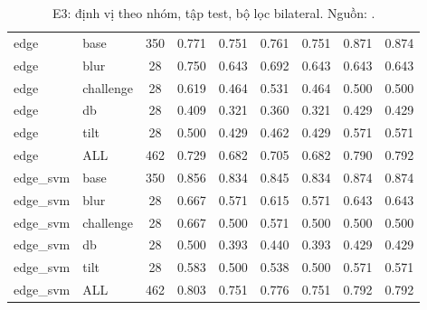 \begin{table}[htbp]
\centering
\caption[E3: định vị theo nhóm (test)]{E3: định vị theo nhóm, tập test, bộ lọc bilateral. Nguồn: .}
\label{tab:e3}
\small
{}
\begin{tabularx}{\textwidth}{llCCCCCCC}
\hline
{}  &  &  &  &  &  &  &  &  \\
\hline
edge & base & 350 & 0.771 & 0.751 & 0.761 & 0.751 & 0.871 & 0.874 \\
edge & blur & 28 & 0.750 & 0.643 & 0.692 & 0.643 & 0.643 & 0.643 \\
edge & challenge & 28 & 0.619 & 0.464 & 0.531 & 0.464 & 0.500 & 0.500 \\
edge & db & 28 & 0.409 & 0.321 & 0.360 & 0.321 & 0.429 & 0.429 \\
edge & tilt & 28 & 0.500 & 0.429 & 0.462 & 0.429 & 0.571 & 0.571 \\
edge & ALL & 462 & 0.729 & 0.682 & 0.705 & 0.682 & 0.790 & 0.792 \\
\hline
edge\_svm & base & 350 & 0.856 & 0.834 & 0.845 & 0.834 & 0.874 & 0.874 \\
edge\_svm & blur & 28 & 0.667 & 0.571 & 0.615 & 0.571 & 0.643 & 0.643 \\
edge\_svm & challenge & 28 & 0.667 & 0.500 & 0.571 & 0.500 & 0.500 & 0.500 \\
edge\_svm & db & 28 & 0.500 & 0.393 & 0.440 & 0.393 & 0.429 & 0.429 \\
edge\_svm & tilt & 28 & 0.583 & 0.500 & 0.538 & 0.500 & 0.571 & 0.571 \\
edge\_svm & ALL & 462 & 0.803 & 0.751 & 0.776 & 0.751 & 0.792 & 0.792 \\
\hline
\end{tabularx}
\end{table}
